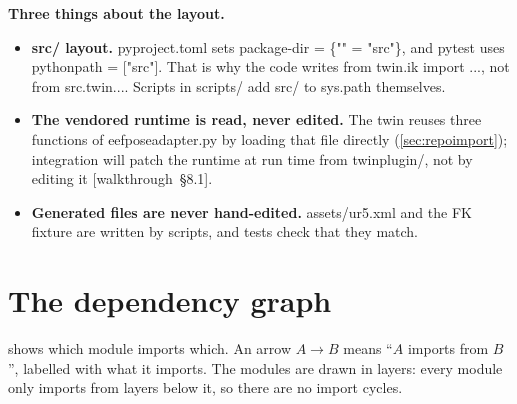 \documentclass[11pt,a4paper]{article}
\newcommand{\code}[1]{{\small\ttfamily\begingroup\def\_{\textunderscore\allowbreak}\def\/{/\allowbreak}#1\endgroup}}
\newcommand{\wt}[1]{\textcolor{blue!60!black}{\small[walkthrough~§#1]}}
\begin{document}
\textbf{Three things about the layout.}
\begin{itemize}
\item \textbf{\code{src/} layout.} \code{pyproject.toml} sets \code{package-dir = \{"" = "src"\}}, and pytest uses \code{pythonpath = ["src"]}. That is why the code writes \code{from twin.ik import ...}, not \code{from src.twin...}. Scripts in \code{scripts/} add \code{src/} to \code{sys.path} themselves.
\item \textbf{The vendored runtime is read, never edited.} The twin reuses three functions of \code{eef\_pose\_adapter.py} by loading that file directly (\cref{sec:repoimport}); integration will patch the runtime at run time from \code{twin\_plugin/}, not by editing it \wt{8.1}.
\item \textbf{Generated files are never hand-edited.} \code{assets/ur5.xml} and the FK fixture are written by scripts, and tests check that they match.
\end{itemize}

\section{The dependency graph}\label{sec:deps}
 shows which module imports which. An arrow $A\to B$ means ``$A$ imports from $B$'', labelled with what it imports. The modules are drawn in layers: every module only imports from layers below it, so there are no import cycles.
\end{document}
